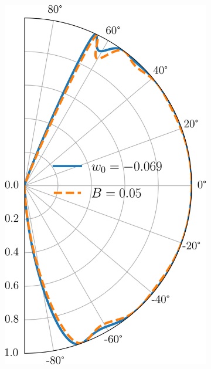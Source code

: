 \begin{figure}[H]
        \begin{subfigure}[b]{0.3\linewidth}
            \includegraphics[width = \linewidth]{fig/pseudo B field/Ef0.0832 U0 B0.05 w-0.069.png}
            \caption{}
            \label{fig:pseudo3}
        \end{subfigure}
        \begin{subfigure}[b]{0.3\linewidth}

\end{subfigure}
\end{figure}
